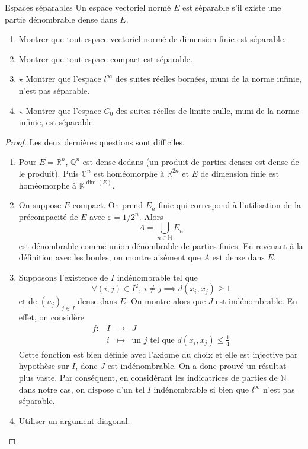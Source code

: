 \documentclass[french,a4paper]{article}
\newcommand{\N}{\mathbb{N}}
\newcommand{\Q}{\mathbb{Q}}
\newcommand{\R}{\mathbb{R}}
\newcommand{\C}{\mathbb{C}}
\newcommand{\K}{\mathbb{K}}
\theoremstyle{plain}
\theoremstyle{definition}
\theoremstyle{remark}
\begin{document}
\begin{ex}[Moulin.33]{Espaces séparables}
	Un espace vectoriel normé $E$ est séparable s'il existe une partie dénombrable dense dans $E$.
	\begin{enumerate}
		\item Montrer que tout espace vectoriel normé de dimension finie est séparable.
		\item Montrer que tout espace compact est séparable.
		\item  $\star$ Montrer que l'espace $l^\infty$ des suites réelles bornées, muni de la norme infinie, n'est pas séparable.
		\item $\star$ Montrer que l'espace $C_0$ des suites réelles de limite nulle, muni de la norme infinie, est séparable.		
	\end{enumerate}
\end{ex}
\begin{proof}
	Les deux dernières questions sont difficiles.
	\begin{enumerate}
		\item Pour $E=\R^n$, $\Q^n$ est dense dedans (un produit de parties denses est dense de le produit). Puis $\C^n$ est homéomorphe à $\R^{2n}$ et $E$ de dimension finie est homéomorphe à $\K^{\dim(E)}$.
		\item On suppose $E$ compact. On prend $E_n$ finie qui correspond à l'utilisation de la précompacité de $E$ avec $\varepsilon=1/2^n$. Alors $$A=\bigcup_{n\in\N} E_n$$ est dénombrable comme union dénombrable de parties finies. En revenant à la définition avec les boules, on montre aisément que $A$ est dense dans $E$.
		\item Supposons l'existence de $I$ indénombrable tel que $$\forall (i,j)\in I^2,\ i\ne j\implies d(x_i,x_j)\geqslant 1$$ et de $(u_j)_{j\in J}$ dense dans $E$. On montre alors que $J$ est indénombrable. En effet, on considère $$\begin{array}{lrcl}
			f:&I&\longrightarrow&J\\
			&i&\longmapsto&\text{un }j\text{ tel que }d(x_i,x_j)\leqslant\frac{1}{4}
		\end{array}$$ Cette fonction est bien définie avec l'axiome du choix et elle est injective par hypothèse sur $I$, donc $J$ est indénombrable. On a donc prouvé un résultat plus vaste. Par conséquent, en considérant les indicatrices de parties de $\N$ dans notre cas, on dispose d'un tel $I$ indénombrable si bien que $l^\infty$ n'est pas séparable.
		\item Utiliser un argument diagonal.
	\end{enumerate}
\end{proof}
\end{document}
